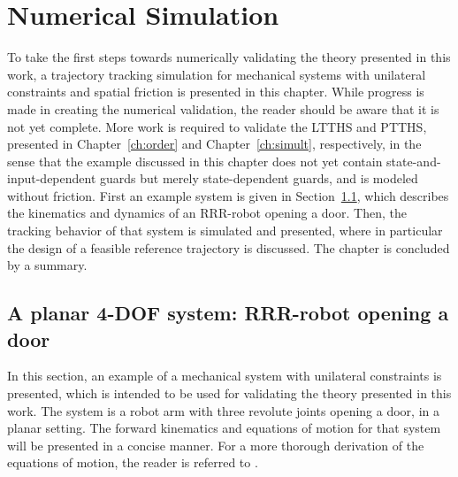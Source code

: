 \documentclass[../DC2019003Bouma.tex]{subfiles}
\begin{document}
\graphicspath{{04_Validation/img/}}
\renewcommand{\chaptermark}[1]{\markboth{\thechapter.\ #1}{}}
\renewcommand{\sectionmark}[1]{\markright{#1}{}}
\pagestyle{fancyreport}
\cleartooddpage
\pagestyle{fancyreport}
\chapter{Numerical Simulation}\label{ch:vali}
To take the first steps towards numerically validating the theory presented in this work, a trajectory tracking simulation for mechanical systems with unilateral constraints and spatial friction is presented in this chapter. While progress is made in creating the numerical validation, the reader should be aware that it is not yet complete. More work is required to validate the LTTHS and PTTHS, presented in Chapter~\ref{ch:order} and Chapter~\ref{ch:simult}, respectively, in the sense that the example discussed in this chapter does not yet contain state-and-input-dependent guards but merely state-dependent guards, and is modeled without friction. First an example system is given in Section~\ref{sec:5sys}, which describes the kinematics and dynamics of an RRR-robot opening a door. Then, the tracking behavior of that system is simulated and presented, where in particular the design of a feasible reference trajectory is discussed. The chapter is concluded by a summary.

\section{A planar 4-DOF system: RRR-robot opening a door}\label{sec:5sys}
In this section, an example of a mechanical system with unilateral constraints is presented, which is intended to be used for validating the theory presented in this work. The system is a robot arm with three revolute joints opening a door, in a planar setting. The forward kinematics and equations of motion for that system will be presented in a concise manner. For a more thorough derivation of the equations of motion, the reader is referred to \cite{Rijnen2018b}. 
\end{document}

